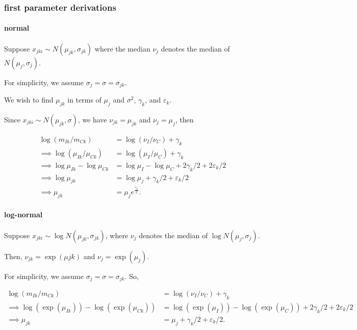 \documentclass[]{article}
\let\oldparagraph\paragraph
\renewcommand{\paragraph}[1]{\oldparagraph{#1}\mbox{}}
\begin{document}
\hypertarget{first-parameter-derivations}{%
\subsubsection{first parameter
derivations}\label{first-parameter-derivations}}

\hypertarget{normal}{%
\paragraph{normal}\label{normal}}

Suppose \(x_{jki} \sim N(\mu_{jk}, \sigma_{jk})\) where the median
\(\nu_j\) denotes the median of \(N(\mu_j, \sigma_j)\).

For simplicity, we assume \(\sigma_j = \sigma = \sigma_{jk}\).

We wish to find \(\mu_{jk}\) in terms of \(\mu_j\) and \(\sigma^2\),
\(\gamma_k\), and \(\varepsilon_k\).

Since \(x_{jki} \sim N(\mu_{jk}, \sigma)\), we have
\(\nu_{jk} = \mu_{jk}\) and \(\nu_j = \mu_j\), then

\begin{align*}
\log(m_{Ik}/m_{Ck}) &= \log(\nu_I/\nu_C) + \gamma_k \\
\implies \log(\mu_{Ik}/\mu_{Ck}) &= \log(\mu_I/\mu_C) + \gamma_k\\
\implies \log\mu_{Ik} - \log\mu_{Ck} &= \log\mu_I - \log\mu_C + 2\gamma_k/2 + 2\varepsilon_k/2\\
\implies \log\mu_{jk} &= \log\mu_j + \gamma_k/2 + \varepsilon_k/2\\
\implies \mu_{jk} &= \mu_j e^{\frac{\gamma_k}{2}}.
\end{align*}

\hypertarget{log-normal}{%
\paragraph{log-normal}\label{log-normal}}

Suppose \(x_{jki} \sim \log N(\mu_{jk}, \sigma_{jk})\), where \(\nu_j\)
denotes the median of \(\log N(\mu_j, \sigma_j)\).

Then, \(\nu_{jk} = \exp(\mu{jk})\) and \(\nu_j = \exp(\mu_j)\).

For simplicity, we assume \(\sigma_j = \sigma = \sigma_{jk}\). So,

\begin{align*}
\log(m_{Ik}/m_{Ck}) &= \log(\nu_I/\nu_C) + \gamma_k \\
\implies \log(\exp(\mu_{Ik})) - \log(\exp(\mu_{Ck})) &= \log(\exp(\mu_I)) - \log(\exp(\mu_C)) + 2\gamma_k/2 + 2\varepsilon_k/2\\
\implies \mu_{jk} &= \mu_j + \gamma_k/2 + \varepsilon_k/2.
\end{align*}
\end{document}
